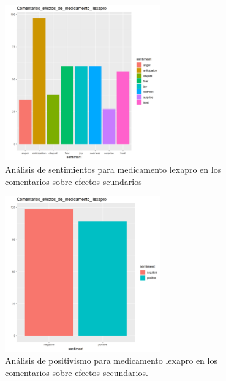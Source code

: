\documentclass[spanish,]{article}
\begin{document}
\begin{figure}[h]
    \centering
    \includegraphics[width=0.6\textwidth]{figuras/sentimientos/Blexapro1.png}
    \caption{Análisis de sentimientos para medicamento lexapro en los comentarios sobre efectos seundarios}
    \label{fig:sentimientos:27}
\end{figure}

\begin{figure}[h]
    \centering
    \includegraphics[width=0.6\textwidth]{figuras/sentimientos/Blexapro2.png}
    \caption{Análisis de positivismo para medicamento lexapro en los comentarios sobre efectos secundarios.}
    \label{fig:sentimientos:28}
\end{figure}
\end{document}
